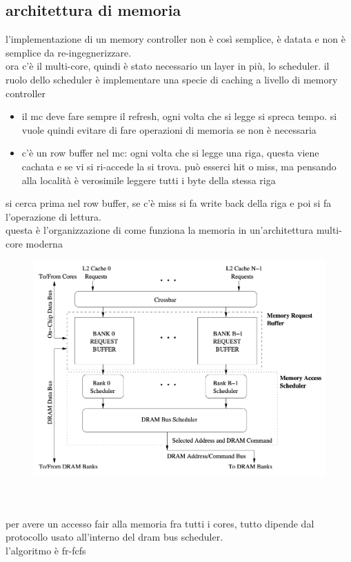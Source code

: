 \documentclass[12pt, oneside]{extbook} %
\begin{document}
\subsection{architettura di memoria}
l'implementazione di un memory controller non è così semplice, è datata e non è semplice da re-ingegnerizzare.\\ ora c'è il multi-core, quindi è stato necessario un layer in più, lo scheduler. il ruolo dello scheduler è implementare una specie di caching a livello di memory controller
\begin{itemize}
\item il mc deve fare sempre il refresh, ogni volta che si legge si spreca tempo. si vuole quindi evitare di fare operazioni di memoria se non è necessaria
\item c'è un row buffer nel mc: ogni volta che si legge una riga, questa viene cachata e se vi si ri-accede la si trova. può esserci hit o miss, ma pensando alla località è verosimile leggere tutti i byte della stessa riga
\end{itemize}
si cerca prima nel row buffer, se c'è miss si fa write back della riga e poi si fa l'operazione di lettura.\\ questa è l'organizzazione di come funziona la memoria in un'architettura multi-core moderna\\
\begin{figure}
	\includegraphics[scale=0.3]{immagini/dram_mc.png}
\end{figure}\\\\
per avere un accesso fair alla memoria fra tutti i cores, tutto dipende dal protocollo usato all'interno del dram bus scheduler.\\l'algoritmo è fr-fcfs
\end{document}
